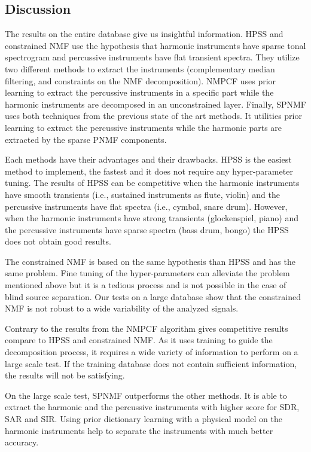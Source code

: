 \documentclass[journal]{IEEEtran}
\begin{document}
\subsection{Discussion}\label{discu}

The results on the entire database give us insightful information.
HPSS and constrained NMF use the hypothesis that harmonic instruments have sparse tonal spectrogram and percussive instruments have flat transient spectra. They utilize two different methods to extract the instruments (complementary median filtering, and constraints on the NMF decomposition).
NMPCF uses prior learning to extract the percussive instruments in a specific part while the harmonic instruments are decomposed in an unconstrained layer. 
Finally, SPNMF uses both techniques from the previous state of the art methods. It utilities prior learning to extract the percussive instruments while the harmonic parts are extracted by the sparse PNMF components.



Each methods have their advantages and their drawbacks. HPSS is the easiest method to implement, the fastest and it does not require any hyper-parameter tuning. The results of HPSS can be competitive when the harmonic instruments have smooth transients (i.e., sustained instruments as flute, violin) and the percussive instruments have flat spectra (i.e., cymbal, snare drum). However, when the harmonic instruments have strong transients (glockenspiel, piano) and the percussive instruments have sparse spectra (bass drum, bongo) the HPSS does not obtain good results. 

The constrained NMF is based on the same hypothesis than HPSS and has the same problem. Fine tuning of the hyper-parameters can alleviate the problem mentioned above but it is a tedious process and is not possible in the case of blind source separation. Our tests on a large database show that the constrained NMF is not robust to a wide variability of the analyzed signals.

Contrary to the results from \cite{canadas2014percussive} the NMPCF algorithm gives competitive results compare to HPSS and constrained NMF. As it uses training to guide the decomposition process, it requires a wide variety of information to perform on a large scale test. If the training database does not contain sufficient information, the results will not be satisfying. 

On the large scale test, SPNMF outperforms the other methods. It is able to extract the harmonic and the percussive instruments with higher score for SDR, SAR and SIR. Using prior dictionary learning with a physical model on the harmonic instruments help to separate the instruments with much better accuracy.
\end{document}

